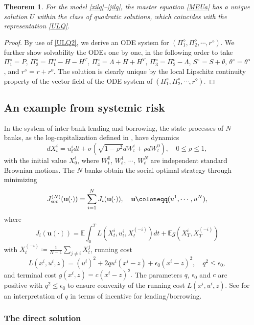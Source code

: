 \documentclass{amsart}
\newtheorem{theorem}{Theorem}[section]
\theoremstyle{definition}
\theoremstyle{remark}
\def\EE{{\mathbb E}}
\numberwithin{equation}{section}
\begin{document}
\begin{theorem}
For the  model \eqref{xilq}--\eqref{jilq}, the master equation \eqref{MEUa} has a unique  solution $U$ within the class of quadratic solutions, which coincides with the representation \eqref{ULQ}.
\end{theorem}

\begin{proof}
By use of \eqref{ULQ2}, we derive an ODE system for $(\Pi_1^\diamond, \Pi_2^\diamond, \cdots, r^\diamond)$. We further show solvability  the ODEs one by one, in the following order to take
$\Pi^\diamond_1 =P$, $\Pi_2^\diamond =\Pi_1^o -H-H^T$,  $\Pi_4^\diamond=\Lambda+H+H^T  $, $ \Pi_3^\diamond=\Pi_2^o-\Lambda $,  $S^\diamond = S+\theta  $, $ \theta^\diamond=\theta^o$,
and $r^\diamond = r+r^o $. The solution is clearly unique by the local Lipschitz continuity property of the vector field of the ODE system of $(\Pi_1^\diamond,
\Pi_2^\diamond, \cdots, r^\diamond  )$.
\end{proof}






\subsection{An example from systemic risk}
\label{sec:sr}


In the system of inter-bank lending and borrowing,
the state processes of $N$ banks,  as the log-capitalization defined in \cite{CFS15}, have dynamics
\[
dX^i_t=u_t^idt+\sigma(\sqrt{1-\rho^2}dW^i_t +\rho dW_t^0),\quad 0\le \rho \le 1,
\]
with the initial value $X^{i}_0$,
where $W_t^0$, $W^1_t$, $\cdots$, $W_t^N$ are independent standard Brownian motions.
The $N$ banks obtain the social optimal strategy through minimizing
\[
J^{(N)}_{\rm soc}({\mathbf u}(\cdot))=\sum_{i=1}^NJ_i({\mathbf u}(\cdot)) ,\quad {\mathbf u}\coloneqq(u^1, \cdots, u^N),
\]
where
\[
J_i({\mathbf u}(\cdot))=\EE\int_0^T L(X_t^i,u_t^i  , X_t^{(-i)})dt+\EE g(X^i_T, X_{T}^{(-i)})
\]
with $X_t^{(-i)}\coloneqq \frac{1}{N-1}\sum_{j\ne i} X_t^j $, running cost
\[
L(x^i ,u^i , z)= (u^i)^2+2qu^i(x^i-z)
+{\epsilon_0}(x^i-z)^2,
\quad q^2\leq\epsilon_0,
\]
and  terminal cost
$
g(x^i,z)={c}(x^{i}-z )^2.
$
The parameters $q$, $\epsilon_0$ and $c$ are positive with $q^2\leq\epsilon_0$  to ensure convexity  of the running cost $L(x^i, u^i,z)$.
See \cite{CFS15} for an interpretation of $q$ in terms of incentive for lending/borrowing.


\subsubsection{The direct solution}
\end{document}
